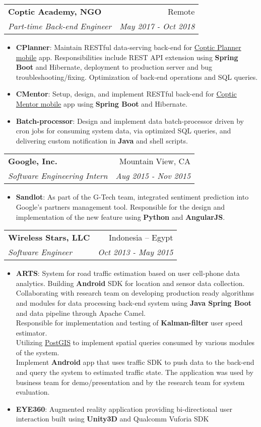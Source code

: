 \documentclass[letterpaper,11pt]{article}
\makeatletter
\newcommand{\resumeItem}[2]{
  \item\small{
    \textbf{#1}{: #2 \vspace{-2pt}}
  }
}
\newcommand{\resumeSubheading}[4]{
  \vspace{-1pt}\item
    \begin{tabular*}{0.97\textwidth}[t]{l@{\extracolsep{\fill}}r}
      \textbf{#1} & #2 \\
      \textit{\small #3} & \textit{\small #4} \\
    \end{tabular*}\vspace{-5pt}
}
\newcommand{\resumeItemListStart}{\begin{itemize}}
\newcommand{\resumeItemListEnd}{\end{itemize}\vspace{-5pt}}
\makeatother
\begin{document}
    \resumeSubheading
      {Coptic Academy, NGO}{Remote}
      {Part-time Back-end Engineer}{May 2017 - Oct 2018}
      \resumeItemListStart
        \resumeItem{CPlanner}
          {Maintain RESTful data-serving back-end for \href{https://play.google.com/store/apps/details?id=org.copticacademy}{Coptic Planner mobile} app. Responsibilities include REST API extension using \textbf{Spring Boot} and Hibernate, deployment to production server and bug troubleshooting/fixing. Optimization of back-end operations and SQL queries.}
        \resumeItem{CMentor}
          {Setup, design, and implement RESTful back-end for \href{https://play.google.com/store/apps/details?id=org.copticacademy.CopticMentor}{Coptic Mentor mobile} app using \textbf{Spring Boot} and Hibernate.}
        \resumeItem{Batch-processor}
          {Design and implement data batch-processor driven by cron jobs for consuming system data, via optimized SQL queries, and delivering custom notification in \textbf{Java} and shell scripts.}
      \resumeItemListEnd

    \resumeSubheading
      {Google, Inc.}{Mountain View, CA}
      {Software Engineering Intern}{Aug 2015 - Nov 2015}
      \resumeItemListStart
        \resumeItem{Sandlot}
          {As part of the G-Tech team, integrated sentiment prediction into Google's partners management tool. Responsible for the design and implementation of the new feature using \textbf{Python}
and \textbf{AngularJS}.}
      \resumeItemListEnd

    \resumeSubheading
      {Wireless Stars, LLC}{Indonesia -- Egypt}
      {Software Engineer}{Oct 2013 - May 2015}
      \resumeItemListStart
        \resumeItem{ARTS}
          {System for road traffic estimation based on user cell-phone data analytics. Building \textbf{Android} SDK for location and sensor data collection.\\
          Collaborating with research team on developing production ready algorithms and modules for data processing back-end system using \textbf{Java Spring Boot} and data pipeline through Apache Camel.\\
          Responsible for implementation and testing of \textbf{Kalman-filter} user speed estimator.\\
          Utilizing \href{https://postgis.net/}{PostGIS} to implement spatial queries consumed by various modules of the system.\\
          Implement \textbf{Android} app that uses traffic SDK to push data to the back-end and query the system to estimated traffic state. The application was used by business team for demo/presentation and by the research team for system evaluation.}
        \resumeItem{EYE360}
          {Augmented reality application providing bi-directional user interaction built using \textbf{Unity3D} and Qualcomm Vuforia SDK}
      \resumeItemListEnd
\end{document}
